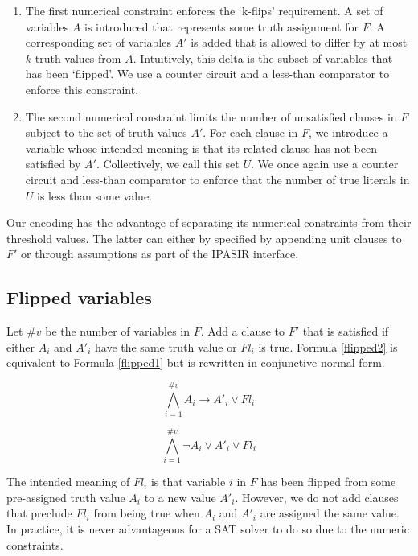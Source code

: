 \documentclass{article}
\begin{document}
\begin{enumerate}
  \item The first numerical constraint enforces the ‘k-flips’ requirement. A
    set of variables $A$ is introduced that represents some truth assignment
    for $F$. A corresponding set of variables $A'$ is added that is allowed to
    differ by at most $k$ truth values from $A$. Intuitively, this delta is the
    subset of variables that has been ‘flipped’. We use a counter circuit and a
    less-than comparator to enforce this constraint.

  \item The second numerical constraint limits the number of unsatisfied
    clauses in $F$ subject to the set of truth values $A'$. For each clause in
    $F$, we introduce a variable whose intended meaning is that its related
    clause has not been satisfied by $A'$. Collectively, we call this set $U$.
    We once again use a counter circuit and less-than comparator to enforce
    that the number of true literals in $U$ is less than some value.
\end{enumerate}

\noindent Our encoding has the advantage of separating its numerical
constraints from their threshold values. The latter can either by specified by
appending unit clauses to $F'$ or through assumptions as part of the IPASIR
interface.

\subsection{Flipped variables}

Let $\#v$ be the number of variables in $F$. Add a clause to $F'$ that is
satisfied if either $A_i$ and $A'_i$ have the same truth value or $Fl_i$ is
true. Formula \ref{flipped2} is equivalent to Formula \ref{flipped1} but is
rewritten in conjunctive normal form.

\begin{equation}
  \label{flipped1}
  \bigwedge\limits_{i=1}^{\#v} A_i \to A'_i \lor Fl_i
\end{equation}\break

\begin{equation}
  \label{flipped2}
  \bigwedge\limits_{i=1}^{\#v} \neg{A_i} \lor A'_i \lor Fl_i
\end{equation}\break

\noindent The intended meaning of $Fl_i$ is that variable $i$ in $F$ has been
flipped from some pre-assigned truth value $A_i$ to a new value $A'_i$. However,
we do not add clauses that preclude $Fl_i$ from being true when $A_i$ and $A'_i$
are assigned the same value. In practice, it is never advantageous for a SAT
solver to do so due to the numeric constraints.
\end{document}
